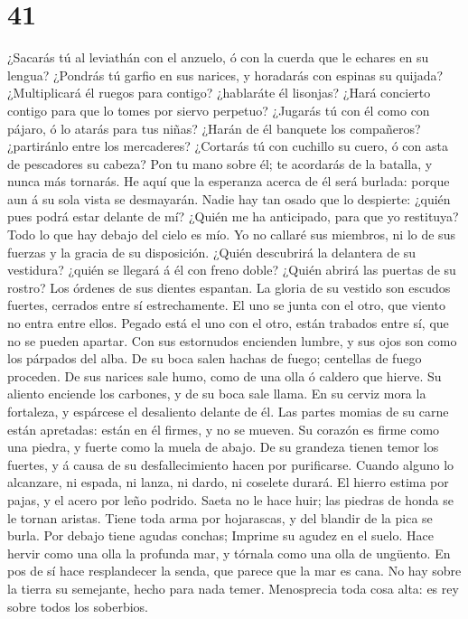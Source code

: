 \hypertarget{section-40}{%
\section{41}\label{section-40}}

 ¿Sacarás tú al leviathán con el anzuelo, ó con la cuerda
que le echares en su lengua?  ¿Pondrás tú garfio en sus
narices, y horadarás con espinas su quijada? 
¿Multiplicará él ruegos para contigo? ¿hablaráte él lisonjas?
 ¿Hará concierto contigo para que lo tomes por siervo
perpetuo?  ¿Jugarás tú con él como con pájaro, ó lo atarás
para tus niñas?  ¿Harán de él banquete los compañeros?
¿partiránlo entre los mercaderes?  ¿Cortarás tú con
cuchillo su cuero, ó con asta de pescadores su cabeza? 
Pon tu mano sobre él; te acordarás de la batalla, y nunca más tornarás.
 He aquí que la esperanza acerca de él será burlada:
porque aun á su sola vista se desmayarán.  Nadie hay tan
osado que lo despierte: ¿quién pues podrá estar delante de mí?
 ¿Quién me ha anticipado, para que yo restituya? Todo lo
que hay debajo del cielo es mío.  Yo no callaré sus
miembros, ni lo de sus fuerzas y la gracia de su disposición.
 ¿Quién descubrirá la delantera de su vestidura? ¿quién
se llegará á él con freno doble?  ¿Quién abrirá las
puertas de su rostro? Los órdenes de sus dientes espantan.
 La gloria de su vestido son escudos fuertes, cerrados
entre sí estrechamente.  El uno se junta con el otro, que
viento no entra entre ellos.  Pegado está el uno con el
otro, están trabados entre sí, que no se pueden apartar. 
Con sus estornudos encienden lumbre, y sus ojos son como los párpados
del alba.  De su boca salen hachas de fuego; centellas de
fuego proceden.  De sus narices sale humo, como de una
olla ó caldero que hierve.  Su aliento enciende los
carbones, y de su boca sale llama.  En su cerviz mora la
fortaleza, y espárcese el desaliento delante de él.  Las
partes momias de su carne están apretadas: están en él firmes, y no se
mueven.  Su corazón es firme como una piedra, y fuerte
como la muela de abajo.  De su grandeza tienen temor los
fuertes, y á causa de su desfallecimiento hacen por purificarse.
 Cuando alguno lo alcanzare, ni espada, ni lanza, ni
dardo, ni coselete durará.  El hierro estima por pajas, y
el acero por leño podrido.  Saeta no le hace huir; las
piedras de honda se le tornan aristas.  Tiene toda arma
por hojarascas, y del blandir de la pica se burla.  Por
debajo tiene agudas conchas; Imprime su agudez en el suelo.
 Hace hervir como una olla la profunda mar, y tórnala
como una olla de ungüento.  En pos de sí hace
resplandecer la senda, que parece que la mar es cana.  No
hay sobre la tierra su semejante, hecho para nada temer. 
Menosprecia toda cosa alta: es rey sobre todos los soberbios.

